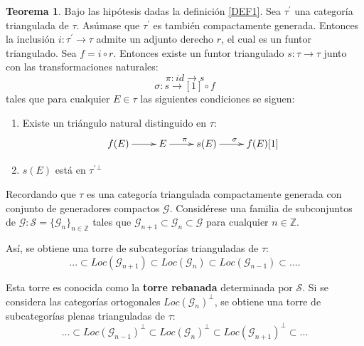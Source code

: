 \documentclass[10pt]{amsart}
\theoremstyle{definition}
\newtheorem{theorem}[definition]{Teorema}
\theoremstyle{remark}
\theoremstyle{definition}
\begin{document}
\begin{theorem}\label{Neeman}
Bajo las hip\'otesis dadas la definición \ref{DEF1}. Sea $\tau^{\prime}$ una categor\'ia triangulada de $\tau$. As\'umase que $\tau^{\prime}$ es tambi\'en compactamente generada. Entonces la inclusi\'on $i:\tau^{\prime} \rightarrow \tau$ admite un adjunto derecho $r$, el cual es un funtor triangulado. Sea $f=i \circ r$. Entonces existe un funtor triangulado $s:\tau \rightarrow \tau$ junto con las transformaciones naturales:
\begin{equation*}
\pi: id \rightarrow s
\end{equation*}
\begin{equation*}
\sigma: s \rightarrow [1] \circ f
\end{equation*}
tales que para cualquier $E \in \tau$ las siguientes condiciones se siguen:
\begin{enumerate}
\item Existe un triángulo natural distinguido en $\tau$:
\begin{equation*}
 \xymatrix{ f(E) \ar[r] & E \ar[r]^{\pi} & s(E) \ar[r]^{\sigma} & 
f(E)[1]}
\end{equation*}
\item $s(E)$ está en $\tau^{\prime}{^{\perp}}$
\end{enumerate}
\end{theorem}

Recordando que $\tau$ es una categoría triangulada compactamente generada con conjunto de generadores compactos $\mathcal{G}$.
Considérese una familia de subconjuntos de $\mathcal{G}:\mathcal{S}=\{\mathcal{G}_{n}\}_{n \in \mathbb{Z}}$ tales que $\mathcal{G}_{n+1} \subset \mathcal{G}_{n} \subset \mathcal{G}$ para cualquier $n \in \mathbb{Z}$.

Así, se obtiene una torre de subcategorías trianguladas de $\tau$:
\begin{equation*}
...\subset Loc(\mathcal{G}_{n+1}) \subset Loc(\mathcal{G}_{n}) \subset Loc(\mathcal{G}_{n-1}) \subset....
\end{equation*}

Esta torre es conocida como la \textbf{torre rebanada} determinada por $\mathcal{S}$. Si se considera las categorías ortogonales $Loc(\mathcal{G}_{n})^{\perp}$, se obtiene una torre de subcategorías plenas trianguladas de $\tau$:
\begin{equation*}
...\subset Loc(\mathcal{G}_{n-1})^{\perp} \subset Loc(\mathcal{G}_{n})^{\perp} \subset Loc(\mathcal{G}_{n+1})^{\perp} \subset ...
\end{equation*}
\end{document}
